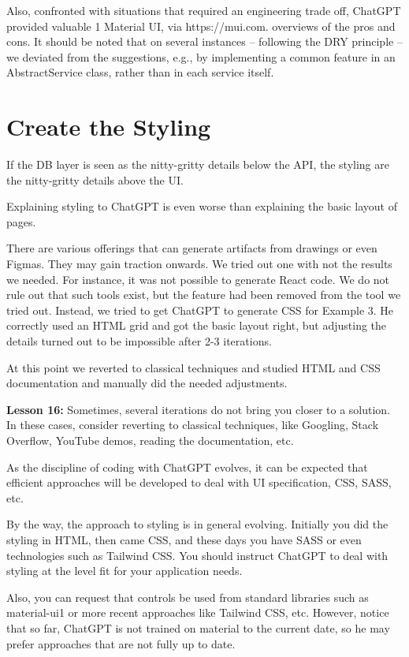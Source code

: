 \documentclass[runningheads]{llncs}
\begin{document}
Also, confronted with situations that required an engineering trade off, ChatGPT provided valuable
1 Material UI, via https://mui.com.
overviews of the pros and cons. It should be noted that on several instances – following the DRY principle – we deviated from the suggestions, e.g., by implementing a common feature in an AbstractService class, rather than in each service itself.

\section{Create the Styling}
If the DB layer is seen as the nitty-gritty details below the API, the styling are the nitty-gritty details above the UI.

Explaining styling to ChatGPT is even worse than explaining the basic layout of pages.

There are various offerings that can generate artifacts from drawings or even Figmas. They may gain traction onwards. We tried out one with not the results we needed. For instance, it was not possible to generate React code. We do not rule out that such tools exist, but the feature had been removed from the tool we tried out.
Instead, we tried to get ChatGPT to generate CSS for Example 3. He correctly used an HTML grid and got the basic layout right, but adjusting the details turned out to be 
impossible after 2-3 iterations.

At this point we reverted to classical techniques and studied HTML and CSS documentation and manually did the needed adjustments.

\textbf{Lesson 16:} Sometimes, several iterations do not bring you closer to a solution. In these cases, consider reverting to classical techniques, like Googling, Stack Overflow, YouTube demos, reading the documentation, etc.

As the discipline of coding with ChatGPT evolves, it can be expected that efficient approaches will be developed to deal with UI specification, CSS, SASS, etc.

By the way, the approach to styling is in general evolving. Initially you did the styling in HTML, then came CSS, and these days you have SASS or even technologies such as Tailwind CSS. You should instruct ChatGPT to deal with styling at the level fit for your application needs.

Also, you can request that controls be used from standard libraries such as material-ui1 or more recent approaches like Tailwind CSS, etc. However, notice that so far, ChatGPT is not trained on material to the current date, so he may prefer approaches that are not fully up to date.
\end{document}

